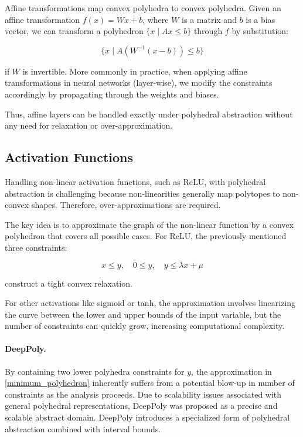 \documentclass[oneside,11pt,dvipsnames]{book}
\numberwithin{equation}{section}
\theoremstyle{definition}
\theoremstyle{remark}
\begin{document}
Affine transformations map convex polyhedra to convex polyhedra.  
Given an affine transformation \(f(x) = Wx + b\), where \(W\) is a matrix and \(b\) is a bias vector, we can transform a polyhedron \(\{x \mid A x \leq b\}\) through \(f\) by substitution:

\[
\{x \mid A (W^{-1}(x - b)) \leq b\}
\]

if \(W\) is invertible. More commonly in practice, when applying affine transformations in neural networks (layer-wise), we modify the constraints accordingly by propagating through the weights and biases.

Thus, affine layers can be handled exactly under polyhedral abstraction without any need for relaxation or over-approximation.

\subsection{Activation Functions}

Handling non-linear activation functions, such as ReLU, with polyhedral abstraction is challenging because non-linearities generally map polytopes to non-convex shapes. Therefore, over-approximations are required.

The key idea is to approximate the graph of the non-linear function by a convex polyhedron that covers all possible cases. For ReLU, the previously mentioned three constraints:

\begin{equation}\label{minimum_polyhedron}
x \leq y, \quad 0 \leq y, \quad y \leq \lambda x + \mu
\end{equation}


construct a tight convex relaxation.

For other activations like sigmoid or tanh, the approximation involves linearizing the curve between the lower and upper bounds of the input variable, but the number of constraints can quickly grow, increasing computational complexity.

\paragraph{DeepPoly.}  
By containing two lower polyhedra constraints for \(y\), the approximation in \ref{minimum_polyhedron} inherently suffers from a potential blow-up in number of constraints as the analysis proceeds. Due to scalability issues associated with general polyhedral representations, DeepPoly \cite{singh2019abstract} was proposed as a precise and scalable abstract domain. DeepPoly introduces a specialized form of polyhedral abstraction combined with interval bounds. 
\end{document}
